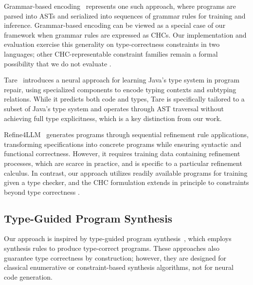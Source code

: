 \documentclass[manuscript,screen]{acmart}
\begin{document}
Grammar-based encoding~\cite{DBLP:conf/acl/YinN17,DBLP:conf/aaai/SunZXSMZ20,DBLP:conf/icse/ZhuL000C24} represents one such approach, where programs are parsed into ASTs and serialized into sequences of grammar rules for training and inference. 
Grammar-based encoding can be viewed as a special case of our framework when grammar rules are expressed as CHCs. Our    {\color{revblue}implementation and evaluation exercise this generality on type-correctness constraints in two languages; other CHC-representable constraint families remain a formal possibility that we do not evaluate} .

Tare~\cite{DBLP:conf/icse/ZhuSZXZ23} introduces a neural approach for learning Java's type system in program repair, using specialized components to encode typing contexts and subtyping relations. While it predicts both code and types, Tare is specifically tailored to a subset of Java's type system and operates through AST traversal without achieving full type explicitness, which is a key distinction from our work.

Refine4LLM~\cite{DBLP:journals/pacmpl/CaiHSLLSD25} generates programs through sequential refinement rule applications, transforming specifications into concrete programs while ensuring syntactic and functional correctness. However, it requires training data containing refinement processes, which are scarce in practice, and is specific to a particular refinement calculus. In contrast, our approach utilizes readily available programs for training given a type checker, and    {\color{revblue}the CHC formulation extends in principle to constraints beyond type correctness} .

\subsection{Type-Guided Program Synthesis}
Our approach is inspired by type-guided program synthesis~\cite{DBLP:journals/pacmpl/GuoJJZWJP20, DBLP:conf/pldi/GuriaFH21, DBLP:conf/pldi/PolikarpovaKS16, DBLP:conf/pldi/OseraZ15}, which employs synthesis rules to produce type-correct programs. These approaches also guarantee type correctness by construction; however, they are designed for classical enumerative or constraint-based synthesis algorithms, not for neural code generation.
\end{document}
